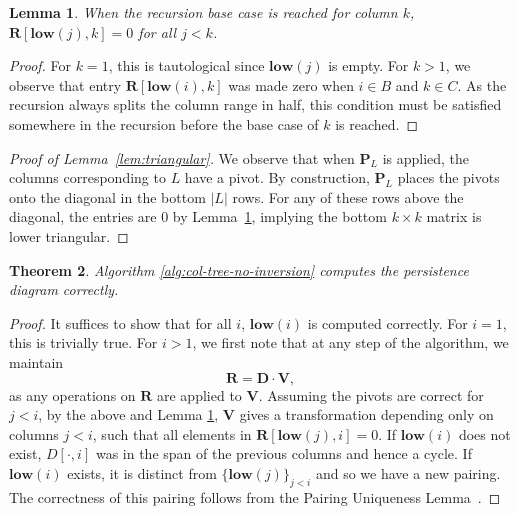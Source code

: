 \documentclass[10pt,a4paper]{article}
\newtheorem{theorem}{Theorem}[section]
\newtheorem{lemma}[theorem]{Lemma}
\newcommand{\mat}[1]{\mathbf{#1}}
\newcommand{\low}{\mathbf{low}}
\newcommand{\Remark}[1]{\textcolor{blue}{[#1]}}
\begin{document}
\begin{lemma}\label{lem:recurse}
When the recursion base case is reached for column $k$, $\mat{R}[\low(j),k]=0$ for all $j<k$.
\end{lemma}
\begin{proof}
For $k=1$, this is tautological since $\low  (j)$ is empty. For $k>1$, we observe that entry $\mat{R}[\low  (i),k]$ was made zero when $i\in B$ and $k\in C$. As the recursion always splits the column range in half, this condition must be satisfied somewhere in the recursion before the base case of $k$ is reached.
\end{proof}

\begin{proof}[Proof of Lemma~\ref{lem:triangular}]
    We observe that when $\mat{P}_L$ is applied, the columns corresponding to $L$ have a pivot.  By construction,  $\mat{P}_L$ places the pivots onto the diagonal in the bottom $|L|$ rows. For any of these rows above the diagonal, the entries are 0 by Lemma~\ref{lem:recurse}, implying the bottom $k\times k$ matrix is lower triangular. 
\end{proof}
\begin{theorem}
Algorithm \ref{alg:col-tree-no-inversion} computes the persistence diagram correctly.
\end{theorem}
\begin{proof}
It suffices to show that for all $i$, $\low(i)$ is computed correctly. For $i=1$, this is trivially true. For $i>1$, we first note that at any step of the algorithm, we maintain 
\[\mat{R} = \mat{D}\cdot \mat{V},\]
as any operations on $\mat{R}$ are applied to $\mat{V}$.  
Assuming the pivots are correct for $j<i$, by the above and Lemma \ref{lem:recurse}, $\mat{V}$ gives a transformation depending only on columns $j<i$, such that all elements in $\mat{R}[\low (j),i]=0$. If $\low (i)$ does not exist, $D[\cdot,i]$ was in the span of the previous columns and hence a cycle.  If $\low (i)$ exists, it  is distinct from $\{\low (j)\}_{j<i}$ and so we have a new pairing. The correctness of this pairing follows from the Pairing Uniqueness Lemma~\cite{cohen2006vines}. 
\end{proof}
\end{document}
